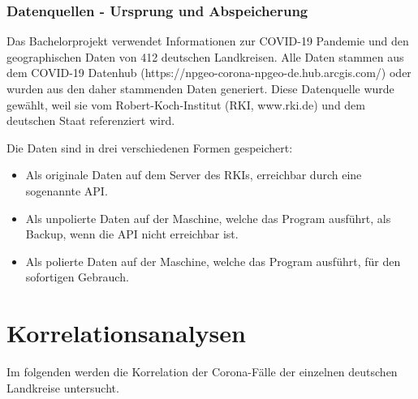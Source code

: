 \subsubsection{Datenquellen - Ursprung und Abspeicherung}
Das Bachelorprojekt verwendet Informationen zur COVID-19 Pandemie und den geographischen Daten von 412 deutschen Landkreisen. Alle Daten stammen aus dem \glqq{}COVID-19 Datenhub\grqq{} (https://npgeo-corona-npgeo-de.hub.arcgis.com/) oder wurden aus den daher stammenden Daten generiert. Diese Datenquelle wurde gewählt, weil sie vom Robert-Koch-Institut (RKI, www.rki.de) und dem deutschen Staat referenziert wird.

Die Daten sind in drei verschiedenen Formen gespeichert:
\begin{itemize}
    \item Als originale Daten auf dem Server des RKIs, erreichbar durch eine sogenannte API.
    \item Als unpolierte Daten auf der Maschine, welche das Program ausführt, als Backup, wenn die API nicht erreichbar ist.
    \item Als polierte Daten auf der Maschine, welche das Program ausführt, für den sofortigen Gebrauch.
\end{itemize}
\section{Korrelationsanalysen}
Im folgenden werden die Korrelation der Corona-Fälle der einzelnen deutschen Landkreise untersucht.

